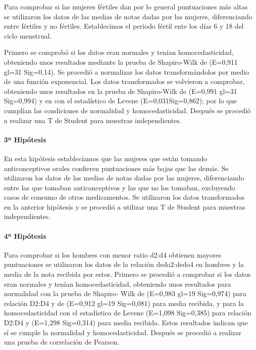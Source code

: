 \documentclass[fleqn,10pt]{SelfArx} %
\begin{document}
Para comprobar si las mujeres fértiles dan por lo general puntuaciones más altas se utilizaron los datos de las medias de notas dadas por las mujeres, diferenciando entre fértiles y no fértiles. Establecimos el periodo fértil ente los días 6 y 18 del ciclo menstrual.

Primero se comprobó si los datos eran normales y tenían homocedasticidad, obteniendo unos resultados mediante la prueba de Shapiro-Wilk de (E=0,911 gl=31 Sig=0,14). Se procedió a normalizar los datos transformándolos por medio de una función exponencial. Los datos transformados se volvieron a comprobar, obteniendo unos resultados en la prueba de Shapiro-Wilk de (E=0,991 gl=31 Sig=0,994) y en con el estadístico de Levene (E=0,031Sig=0,862); por lo que cumplían las condiciones de normalidad y homocedasticidad. Después se procedió a realizar una T de Student para muestras independientes.

\paragraph{3ª Hipótesis} 

En esta hipótesis establecíamos que las mujeres que están tomando anticonceptivos orales confieren puntuaciones más bajas que las demás. Se utilizaron los datos de las medias de notas dadas por las mujeres, diferenciando entre las que tomaban anticonceptivos y las que no los tomaban, excluyendo casos de consumo de otros medicamentos. Se utilizaron los datos transformados en la anterior hipótesis y se procedió a utilizar una T de Student para muestras independientes.

\paragraph{4ª Hipótesis} 

Para comprobar si los hombres con menor ratio d2:d4 obtienen mayores puntuaciones se utilizaron los datos de la relación dedo2:dedo4 en hombres y la media de la nota recibida por estos. Primero se procedió a comprobar si los datos eran normales y tenían homocedasticidad, obteniendo unos resultados para normalidad con la prueba de Shapiro- Wilk de (E=0,983 gl=19 Sig=0,974) para relación D2:D4 y de (E=0,912 gl=19 Sig=0,081) para media recibida, y para la homocedasticidad con el estadístico de Levene (E=1,098 Sig=0,385) para relación D2:D4 y (E=1,298 Sig=0,314) para media recibida. Estos resultados indican que sí se cumple la normalidad y homocedasticidad. Después se procedió a realizar una prueba de correlación de Pearson.
\end{document}
